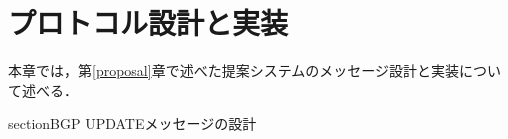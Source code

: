 \chapter{プロトコル設計と実装}
\label{implementation}
本章では，第\ref{proposal}章で述べた提案システムのメッセージ設計と実装について述べる．

section{BGP UPDATEメッセージの設計}





